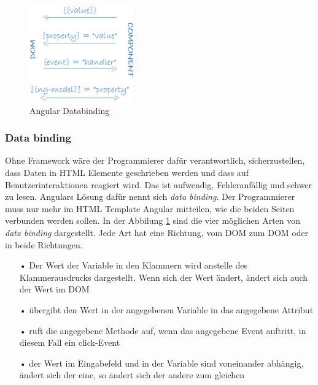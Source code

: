 \mbox{}
\begin{figure}
\vspace{-50pt}
  \begin{center}
    \includegraphics[width=0.4\textwidth]{Bilder/Greistorfer/databinding}
  \end{center}
  \caption[Angular Databinding]{Angular Databinding\protect\footnotemark}
  \label{Angular Databinding}
  \vspace{0pt}
\end{figure}
\vspace{-40pt}


\subsubsection{Data binding}
\label{sec:ang-data-binding}
Ohne Framework wäre der Programmierer dafür verantwortlich, sicherzustellen, dass Daten in \ac{HTML} Elemente geschrieben werden und dass auf Benutzerinteraktionen reagiert wird. Das ist aufwendig, Fehleranfällig und schwer zu lesen. Angulars Lösung dafür nennt sich \textit{data binding}. Der Programmierer muss nur mehr im \ac{HTML} Template Angular mitteilen, wie die beiden Seiten verbunden werden sollen. In der Abbilung \ref{Angular Databinding} sind die vier möglichen Arten von \textit{data binding} dargestellt. Jede Art hat eine Richtung, vom \ac{DOM} zum \ac{DOM} oder in beide Richtungen.

\begin{itemize}
\item[•]  Der Wert der Variable in den Klammern wird anstelle des Klammerausdrucks dargestellt. Wenn sich der Wert ändert, ändert sich auch der Wert im \ac{DOM}
\item[•]  übergibt den Wert in der angegebenen Variable in das angegebene Attribut
\item[•]  ruft die angegebene Methode auf, wenn das angegebene Event auftritt, in diesem Fall ein click-Event
\item[•]  der Wert im Eingabefeld und in der Variable sind voneinander abhängig, ändert sich der eine, so ändert sich der andere zum gleichen
\end{itemize}

